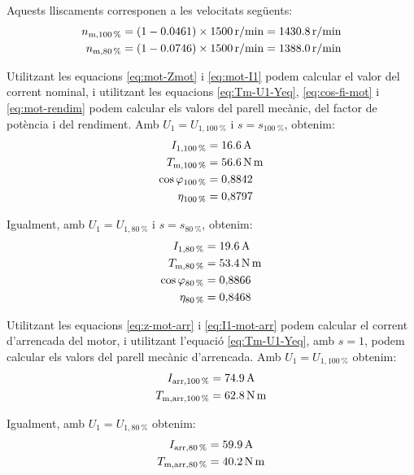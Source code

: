 \begin{exemple}
	Aquests lliscaments corresponen a les velocitats següents:
	\begin{align*}
		n_\mathrm{m,\qty{100}{\%}} &= (1-\num{0,0461})\times \qty{1500}{r/min} = \qty{1430,8}{r/min} \\
		n_\mathrm{m,\qty{80}{\%}} &= (1-\num{0,0746})\times \qty{1500}{r/min} = \qty{1388,0}{r/min}
	\end{align*}
	
	Utilitzant les equacions \eqref{eq:mot-Zmot} i \eqref{eq:mot-I1} podem calcular el valor del corrent nominal, i utilitzant les equacions \eqref{eq:Tm-U1-Yeq}, \eqref{eq:cos-fi-mot} i \eqref{eq:mot-rendim} podem calcular els valors del parell mecànic, del factor de potència i del rendiment. Amb $U_1 = U_{1,\qty{100}{\%}}$  i $s = s_{\qty{100}{\%}}$, obtenim:
	\begin{align*}
		I_{1,\qty{100}{\%}} &= \qty{16,6}{A} \\
		T_\mathrm{m,\qty{100}{\%}} &=  \qty{56,6}{N.m} \\
		\cos\varphi_{\qty{100}{\%}} &=  0{,}8842 \\
		\eta_{\qty{100}{\%}} &=  0{,}8797
	\end{align*}
	
	Igualment, amb $U_1 = U_{1,\qty{80}{\%}}$ i $s = s_{\qty{80}{\%}}$, obtenim:
	\pagebreak
	\begin{align*}
		I_{1,\qty{80}{\%}} &= \qty{19,6}{A} \\
		T_\mathrm{m,\qty{80}{\%}} &=  \qty{53,4}{N.m} \\
		\cos\varphi_{\qty{80}{\%}} &=  0{,}8866 \\
		\eta_{\qty{80}{\%}} &=  0{,}8468
	\end{align*}

	Utilitzant les equacions \eqref{eq:z-mot-arr} i \eqref{eq:I1-mot-arr} podem calcular el corrent d'arrencada del motor, i utilitzant l'equació \eqref{eq:Tm-U1-Yeq}, amb $s=1$, podem calcular els valors del parell mecànic d'arrencada. Amb $U_1 = U_{1,\qty{100}{\%}}$   obtenim:
	\vspace{-2mm}
	\begin{align*}
		I_\mathrm{arr,\qty{100}{\%}} &=  \qty{74,9}{A} \\
		T_\mathrm{m,arr,\qty{100}{\%}} &=  \qty{62,8}{N.m} 
	\end{align*}
	
	Igualment, amb $U_1 = U_{1,\qty{80}{\%}}$ obtenim:
	\vspace{-2mm}
	\begin{align*}
		I_\mathrm{arr,\qty{80}{\%}} &=  \qty{59,9}{A} \\
		T_\mathrm{m,arr,\qty{80}{\%}} &=  \qty{40,2}{N.m} 
	\end{align*}
	

\end{exemple}
